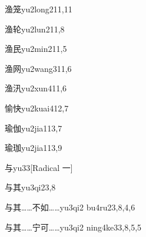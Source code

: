 \begin{verbete}{渔笼}{yu2long2}{11,11}
\end{verbete}

\begin{verbete}{渔轮}{yu2lun2}{11,8}
\end{verbete}

\begin{verbete}{渔民}{yu2min2}{11,5}
\end{verbete}

\begin{verbete}{渔网}{yu2wang3}{11,6}
\end{verbete}

\begin{verbete}{渔汛}{yu2xun4}{11,6}
\end{verbete}

\begin{verbete}{愉快}{yu2kuai4}{12,7}
\end{verbete}

\begin{verbete}{瑜伽}{yu2jia1}{13,7}
\end{verbete}

\begin{verbete}{瑜珈}{yu2jia1}{13,9}
\end{verbete}

\begin{verbete}{与}{yu3}{3}[Radical 一]
\end{verbete}

\begin{verbete}{与其}{yu3qi2}{3,8}
\end{verbete}

\begin{verbete}{与其……不如……}{yu3qi2 bu4ru2}{3,8,4,6}
\end{verbete}

\begin{verbete}{与其……宁可……}{yu3qi2 ning4ke3}{3,8,5,5}
\end{verbete}

